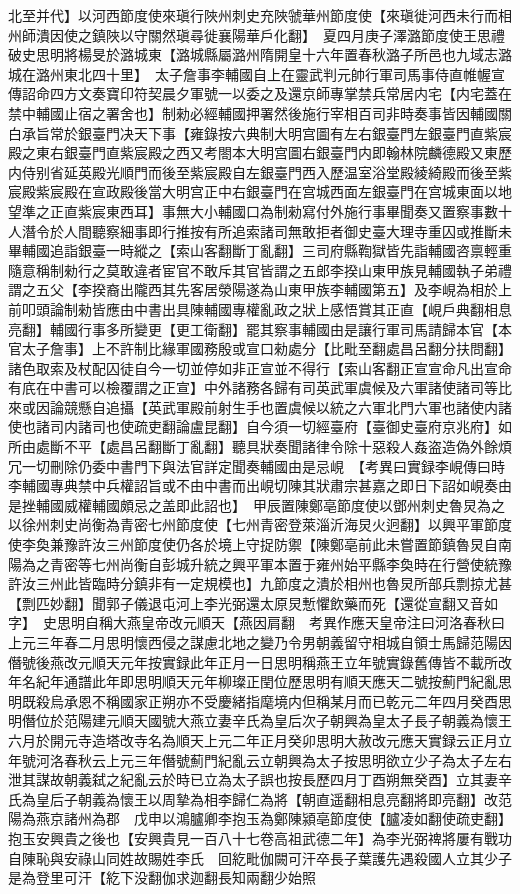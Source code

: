 北至并代】以河西節度使來瑱行陜州刺史充陜虢華州節度使【來瑱徙河西未行而相州師潰因使之鎮陜以守關然瑱尋徙襄陽華戶化翻】　夏四月庚子澤潞節度使王思禮破史思明將楊旻於潞城東【潞城縣屬潞州隋開皇十六年置春秋潞子所邑也九域志潞城在潞州東北四十里】　太子詹事李輔國自上在靈武判元帥行軍司馬事侍直帷幄宣傳詔命四方文奏寶印符契晨夕軍號一以委之及還京師專掌禁兵常居内宅【内宅蓋在禁中輔國止宿之署舍也】制勑必經輔國押署然後施行宰相百司非時奏事皆因輔國關白承旨常於銀臺門决天下事【雍錄按六典制大明宫圖有左右銀臺門左銀臺門直紫宸殿之東右銀臺門直紫宸殿之西又考閤本大明宫圖右銀臺門内即翰林院麟德殿又東歷内侍别省延英殿光順門而後至紫宸殿自左銀臺門西入歷温室浴堂殿綾綺殿而後至紫宸殿紫宸殿在宣政殿後當大明宫正中右銀臺門在宫城西面左銀臺門在宫城東面以地望準之正直紫宸東西耳】事無大小輔國口為制勑寫付外施行事畢聞奏又置察事數十人潛令於人間聽察細事即行推按有所追索諸司無敢拒者御史臺大理寺重囚或推斷未畢輔國追詣銀臺一時縱之【索山客翻斷丁亂翻】三司府縣鞫獄皆先詣輔國咨禀輕重隨意稱制勑行之莫敢違者宦官不敢斥其官皆謂之五郎李揆山東甲族見輔國執子弟禮謂之五父【李揆裔出隴西其先客居滎陽遂為山東甲族李輔國第五】及李峴為相於上前叩頭論制勑皆應由中書出具陳輔國專權亂政之狀上感悟賞其正直【峴戶典翻相息亮翻】輔國行事多所變更【更工衛翻】罷其察事輔國由是讓行軍司馬請歸本官【本官太子詹事】上不許制比緣軍國務殷或宣口勑處分【比毗至翻處昌呂翻分扶問翻】諸色取索及杖配囚徒自今一切並停如非正宣並不得行【索山客翻正宣宣命凡出宣命有㡳在中書可以檢覆謂之正宣】中外諸務各歸有司英武軍虞候及六軍諸使諸司等比來或因論競懸自追攝【英武軍殿前射生手也置虞候以統之六軍北門六軍也諸使内諸使也諸司内諸司也使疏吏翻論盧昆翻】自今須一切經臺府【臺御史臺府京兆府】如所由處斷不平【處昌呂翻斷丁亂翻】聽具狀奏聞諸律令除十惡殺人姦盗造偽外餘煩冗一切刪除仍委中書門下與法官詳定聞奏輔國由是忌峴　【考異曰實録李峴傳曰時李輔國專典禁中兵權詔旨或不由中書而出峴切陳其狀肅宗甚嘉之即日下詔如峴奏由是挫輔國威權輔國頗忌之盖即此詔也】　甲辰置陳鄭亳節度使以鄧州刺史魯炅為之以徐州刺史尚衡為青密七州節度使【七州青密登萊淄沂海炅火迥翻】以興平軍節度使李奐兼豫許汝三州節度使仍各於境上守捉防禦【陳鄭亳前此未嘗置節鎮魯炅自南陽為之青密等七州尚衡自彭城升統之興平軍本置于雍州始平縣李奐時在行營使統豫許汝三州此皆臨時分鎮非有一定規模也】九節度之潰於相州也魯炅所部兵剽掠尤甚【剽匹妙翻】聞郭子儀退屯河上李光弼還太原炅慙懼飲藥而死【還從宣翻又音如字】　史思明自稱大燕皇帝改元順天【燕因肩翻　考異作應天皇帝注曰河洛春秋曰上元三年春二月思明懷西侵之謀慮北地之變乃令男朝義留守相城自領士馬歸范陽因僭號後燕改元順天元年按實録此年正月一日思明稱燕王立年號實錄舊傳皆不載所改年名紀年通譜此年即思明順天元年柳璨正閏位歷思明有順天應天二號按薊門紀亂思明既殺烏承恩不稱國家正朔亦不受慶緒指麾境内但稱某月而已乾元二年四月癸酉思明僭位於范陽建元順天國號大燕立妻辛氏為皇后次子朝興為皇太子長子朝義為懷王六月於開元寺造塔改寺名為順天上元二年正月癸卯思明大赦改元應天實録云正月立年號河洛春秋云上元三年僭號薊門紀亂云立朝興為太子按思明欲立少子為太子左右泄其謀故朝義弑之紀亂云於時已立為太子誤也按長歷四月丁酉朔無癸酉】立其妻辛氏為皇后子朝義為懷王以周摯為相李歸仁為將【朝直遥翻相息亮翻將即亮翻】改范陽為燕京諸州為郡　戊申以鴻臚卿李抱玉為鄭陳潁亳節度使【臚凌如翻使疏吏翻】抱玉安興貴之後也【安興貴見一百八十七卷高祖武德二年】為李光弼禆將屢有戰功自陳恥與安祿山同姓故賜姓李氏　回紇毗伽闕可汗卒長子葉護先遇殺國人立其少子是為登里可汗【紇下没翻伽求迦翻長知兩翻少始照